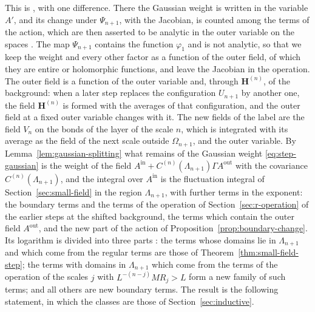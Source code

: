 \documentclass[11pt]{preprint}
\numberwithin{equation}{section}
\begin{document}
This is \cite[(3.23), (3.24), p.~270]{BalabanCRE}, with one difference. There the Gaussian weight is written in the variable $A'$, and its change under $\Psi_{n+1}$, with the Jacobian, is counted among the terms of the action, which are then asserted to be analytic in the outer variable on the spaces \cite[(3.43), p.~276]{BalabanCRE}. The map $\Psi_{n+1}$ contains the function $\varphi_1$ and is not analytic, so that we keep the weight and every other factor as a function of the outer field, of which they are entire or holomorphic functions, and leave the Jacobian in the operation. The outer field is a function of the outer variable and, through $\mathbf H^{(n)}$, of the background: when a later step replaces the configuration $U_{n+1}$ by another one, the field $\mathbf H^{(n)}$ is formed with the averages of that configuration, and the outer field at a fixed outer variable changes with it. The new fields of the label are the field $V_n$ on the bonds of the layer of the scale $n$, which is integrated with its average as the field of the next scale outside $\Omega_{n+1}$, and the outer variable. By Lemma~\ref{lem:gaussian-splitting} what remains of the Gaussian weight \eqref{eq:step-gaussian} is the weight of the field $A^{\mathrm{in}} + C^{(n)}(\Lambda_{n+1})\Gamma A^{\mathrm{out}}$ with the covariance $C^{(n)}(\Lambda_{n+1})$, and the integral over $A^{\mathrm{in}}$ is the fluctuation integral of Section~\ref{sec:small-field} in the region $\Lambda_{n+1}$, with further terms in the exponent: the boundary terms and the terms of the operation of Section~\ref{sec:r-operation} of the earlier steps at the shifted background, the terms which contain the outer field $A^{\mathrm{out}}$, and the new part of the action of Proposition~\ref{prop:boundary-change}. Its logarithm is divided into three parts \cite[(3.26)--(3.47), pp.~271--279]{BalabanCRE}: the terms whose domains lie in $\Lambda_{n+1}$ and which come from the regular terms are those of Theorem~\ref{thm:small-field-step}; the terms with domains in $\Lambda_{n+1}$ which come from the terms of the operation of the scales $j$ with $L^{-(n-j)}MR_j > L$ form a new family of such terms; and all others are new boundary terms. The result is the following statement, in which the classes are those of Section~\ref{sec:inductive}.
\end{document}
